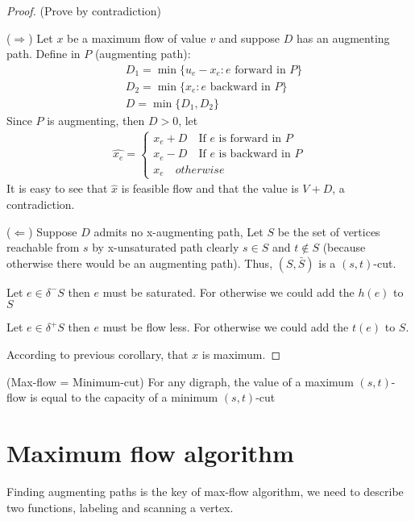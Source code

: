 			\begin{proof}
				(Prove by contradiction) 

				($\Rightarrow$) Let $x$ be a maximum flow of value $v$ and suppose $D$ has an augmenting path. Define in $P$ (augmenting path):
				\begin{align}
					& D_1 = \min \{u_e-x_e: e \text{ forward in } P\} \\
					& D_2 = \min \{x_e: e \text{ backward in } P\}\\
					& D = \min \{D_1, D_2\}
				\end{align}
				Since $P$ is augmenting, then $D > 0$, let
				\begin{align}
					\hat{x_e} = \begin{cases}
						x_e + D \quad \text{If $e$ is forward in $P$}\\
						x_e - D \quad \text{If $e$ is backward in $P$}\\
						x_e \quad otherwise
					\end{cases}
				\end{align}
				It is easy to see that $\hat{x}$ is feasible flow and that the value is $V+D$, a contradiction.

				($\Leftarrow$) Suppose $D$ admits no x-augmenting path, Let $S$ be the set of vertices reachable from $s$ by x-unsaturated path clearly $s\in S$ and $t\notin S$ (because otherwise there would be an augmenting path). Thus, $(S, \bar{S})$ is a $(s, t)$-cut.

				Let $e\in \delta^-{S}$ then $e$ must be saturated. For otherwise we could add the $h(e)$ to $S$

				Let $e\in \delta^+{S}$ then $e$ must be flow less. For otherwise we could add the $t(e)$ to $S$.

				According to previous corollary, that $x$ is maximum.
			\end{proof}

			\begin{theorem}(Max-flow = Minimum-cut)
				For any digraph, the value of a maximum $(s, t)$-flow is equal to the capacity of a minimum $(s, t)$-cut
			\end{theorem}

		\section{Maximum flow algorithm}
			Finding augmenting paths is the key of max-flow algorithm, we need to describe two functions, labeling and scanning a vertex.

